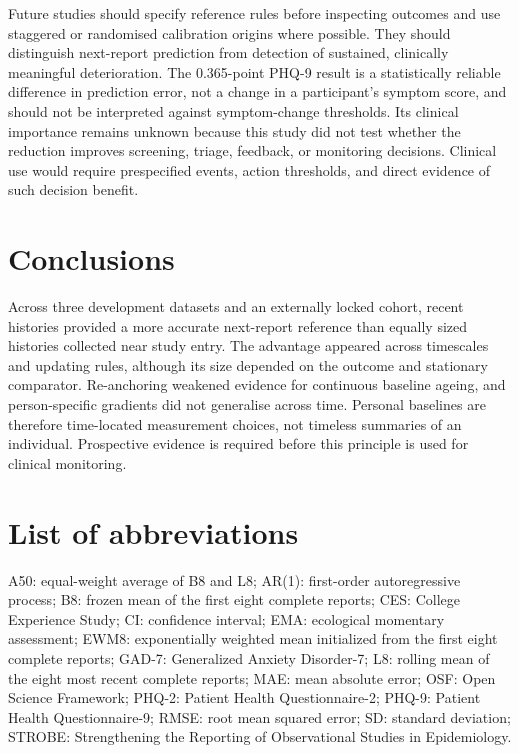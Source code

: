 \documentclass[pdflatex,sn-vancouver-num]{sn-jnl}
\begin{document}
Future studies should specify reference rules before inspecting outcomes and use staggered or randomised calibration origins where possible. They should distinguish next-report prediction from detection of sustained, clinically meaningful deterioration. The 0.365-point PHQ-9 result is a statistically reliable difference in prediction error, not a change in a participant's symptom score, and should not be interpreted against symptom-change thresholds. Its clinical importance remains unknown because this study did not test whether the reduction improves screening, triage, feedback, or monitoring decisions. Clinical use would require prespecified events, action thresholds, and direct evidence of such decision benefit.

\section{Conclusions}

Across three development datasets and an externally locked cohort, recent histories provided a more accurate next-report reference than equally sized histories collected near study entry. The advantage appeared across timescales and updating rules, although its size depended on the outcome and stationary comparator. Re-anchoring weakened evidence for continuous baseline ageing, and person-specific gradients did not generalise across time. Personal baselines are therefore time-located measurement choices, not timeless summaries of an individual. Prospective evidence is required before this principle is used for clinical monitoring.

\section{List of abbreviations}

A50: equal-weight average of B8 and L8; AR(1): first-order autoregressive process; B8: frozen mean of the first eight complete reports; CES: College Experience Study; CI: confidence interval; EMA: ecological momentary assessment; EWM8: exponentially weighted mean initialized from the first eight complete reports; GAD-7: Generalized Anxiety Disorder-7; L8: rolling mean of the eight most recent complete reports; MAE: mean absolute error; OSF: Open Science Framework; PHQ-2: Patient Health Questionnaire-2; PHQ-9: Patient Health Questionnaire-9; RMSE: root mean squared error; SD: standard deviation; STROBE: Strengthening the Reporting of Observational Studies in Epidemiology.
\end{document}

